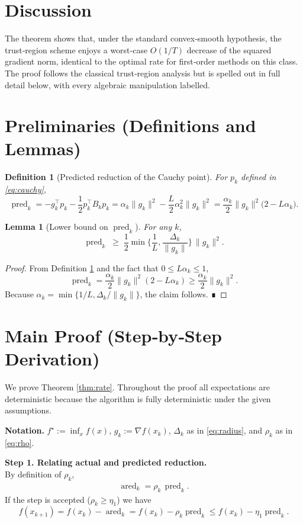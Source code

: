 \documentclass{article}
\newtheorem{lemma}{Lemma}
\newtheorem{definition}{Definition}
\begin{document}
\section*{Discussion}
The theorem shows that, under the standard convex‑smooth hypothesis, the
trust‑region scheme enjoys a worst‑case $O(1/T)$ decrease of the squared
gradient norm, identical to the optimal rate for first‑order methods on this
class.  The proof follows the classical trust‑region analysis but is spelled
out in full detail below, with every algebraic manipulation labelled.

\section*{Preliminaries (Definitions and Lemmas)}
\begin{definition}[Predicted reduction of the Cauchy point]\label{def:pred}
For $p_k$ defined in \eqref{eq:cauchy},
\[
\operatorname{pred}_k
= -g_k^{\top}p_k -\frac12 p_k^{\top}B_k p_k
= \alpha_k\|g_k\|^{2}-\frac{L}{2}\alpha_k^{2}\|g_k\|^{2}
= \frac{\alpha_k}{2}\|g_k\|^{2}\bigl(2-L\alpha_k\bigr).
\]
\end{definition}
\begin{lemma}[Lower bound on $\operatorname{pred}_k$]\label{lem:predlb}
For any $k$,
\[
\operatorname{pred}_k\;\ge\;
\frac12\min\!\Big\{\frac{1}{L},\frac{\Delta_k}{\|g_k\|}\Big\}\,\|g_k\|^{2}.
\tag{L1}
\]
\end{lemma}
\begin{proof}
From Definition \ref{def:pred} and the fact that $0\le L\alpha_k\le1$,
\[
\operatorname{pred}_k
= \frac{\alpha_k}{2}\|g_k\|^{2}(2-L\alpha_k)
\ge \frac{\alpha_k}{2}\|g_k\|^{2}.
\]
Because $\alpha_k=\min\{1/L,\Delta_k/\|g_k\| \}$, the claim follows. ∎
\end{proof}

\section*{Main Proof (Step‑by‑Step Derivation)}
We prove Theorem \ref{thm:rate}.  Throughout the proof all expectations are
deterministic because the algorithm is fully deterministic under the given
assumptions.

\noindent\textbf{Notation.}  $f^{\star}:=\inf_{x}f(x)$, $g_k:=\nabla f(x_k)$,
$\Delta_k$ as in \eqref{eq:radius}, and $\rho_k$ as in \eqref{eq:rho}.

\bigskip
\noindent\textbf{Step 1.  Relating actual and predicted reduction.}\\
\noindent By definition of $\rho_k$,
\begin{align}
\operatorname{ared}_k
= \rho_k\,\operatorname{pred}_k .
\tag{S1}
\end{align}
If the step is accepted ($\rho_k\ge\eta_1$) we have
\[
f(x_{k+1}) = f(x_k)-\operatorname{ared}_k
= f(x_k)-\rho_k\operatorname{pred}_k
\le f(x_k)-\eta_1\operatorname{pred}_k .
\tag{S2}
\]
\end{document}
